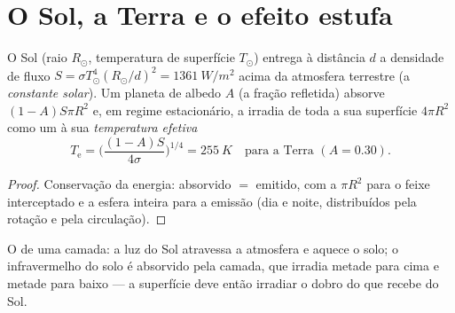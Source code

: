 \section{O Sol, a Terra e o efeito estufa}

\begin{proposition}\label{prop:b2:thermal-radiation:earth}
O Sol (raio $R_\odot$, temperatura de superfície $T_\odot$) entrega à
distância $d$ a densidade de fluxo $S = \sigma T_\odot^4 (R_\odot/d)^2 =
\qty{1361}{W/m^2}$ acima da atmosfera terrestre (a \emph{constante
solar}). Um planeta de albedo $A$ (a fração
refletida) absorve $(1 - A)S\pi R^2$ e, em regime estacionário, a irradia
de toda a sua superfície $4\pi R^2$ como um  à sua \emph{temperatura
efetiva}
\[
T_{\text{e}} = \Big(\frac{(1 - A)S}{4\sigma}\Big)^{1/4} = \qty{255}{K}
\quad\text{para a Terra } (A = 0.30) .
\]
\end{proposition}

\begin{proof}
Conservação da energia: absorvido $= $ emitido, com a  $\pi R^2$
para o feixe interceptado e a esfera inteira para a emissão (dia e
noite, distribuídos pela rotação e pela circulação).
\end{proof}

\begin{omfigure}

{\small O  de uma camada: a luz do Sol atravessa a atmosfera e
aquece o solo; o infravermelho do solo é absorvido pela camada, que
irradia metade para cima e metade para baixo --- a superfície deve então irradiar o dobro
do que recebe do Sol.}
\end{omfigure}

